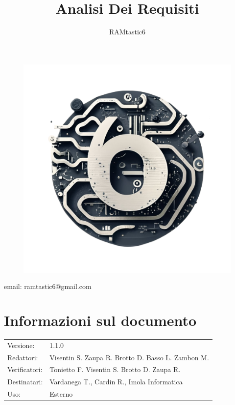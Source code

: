 \documentclass[12pt, oneside]{article}
\author{RAMtastic6}
\begin{document}
\thispagestyle{empty}
\title{Analisi Dei Requisiti}
\maketitle
\begin{figure}[h]
  \centering
  \includegraphics[scale=0.3]{logo.png}
\end{figure}
\begin{center}
    email: ramtastic6@gmail.com
\end{center}

\section*{Informazioni sul documento} 
\begin{tabular}{ll}
Versione: & 1.1.0 \\
Redattori: &  Visentin S.  Zaupa R. Brotto D. Basso L. Zambon M. \\ 
Verificatori: & Tonietto F. Visentin S. Brotto D. Zaupa R.\\
Destinatari: & Vardanega T., Cardin R., Imola Informatica \\
Uso: & Esterno
\end{tabular}
\newpage

\end{document}
